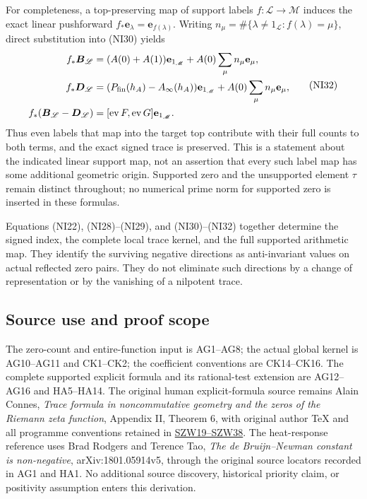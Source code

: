 \documentclass[
  10pt,
  a4paper,
]{article}
\begin{document}
For completeness, a top-preserving map of support labels
\(f:\mathscr L\to\mathscr M\) induces the exact linear pushforward
\(f_*\mathbf e_\lambda=\mathbf e_{f(\lambda)}\). Writing
\(n_\mu=\#\{\lambda\ne1_{\mathscr L}:f(\lambda)=\mu\}\), direct
substitution into (NI30) yields \[
\begin{aligned}
f_*\boldsymbol B_{\mathscr L}
&=(A(0)+A(1))\mathbf e_{1_{\mathscr M}}
+A(0)\sum_\mu n_\mu\mathbf e_\mu,\\
f_*\boldsymbol D_{\mathscr L}
&=(P_{\rm fin}(h_A)-A_\infty(h_A))\mathbf e_{1_{\mathscr M}}
+A(0)\sum_\mu n_\mu\mathbf e_\mu,\\
f_*(\boldsymbol B_{\mathscr L}-\boldsymbol D_{\mathscr L})
&=[\operatorname{ev}F,\operatorname{ev}G]\mathbf e_{1_{\mathscr M}}.
\end{aligned}
\tag{NI32}
\] Thus even labels that map into the target top contribute with their
full counts to both terms, and the exact signed trace is preserved. This
is a statement about the indicated linear support map, not an assertion
that every such label map has some additional geometric origin.
Supported zero and the unsupported element \(\tau\) remain distinct
throughout; no numerical prime norm for supported zero is inserted in
these formulas.

Equations (NI22), (NI28)--(NI29), and (NI30)--(NI32) together determine
the signed index, the complete local trace kernel, and the full
supported arithmetic map. They identify the surviving negative
directions as anti-invariant values on actual reflected zero pairs. They
do not eliminate such directions by a change of representation or by the
vanishing of a nilpotent trace.

\subsection{Source use and proof
scope}\label{source-use-and-proof-scope}

The zero-count and entire-function input is AG1--AG8; the actual global
kernel is AG10--AG11 and CK1--CK2; the coefficient conventions are
CK14--CK16. The complete supported explicit formula and its
rational-test extension are AG12--AG16 and HA5--HA14. The original human
explicit-formula source remains Alain Connes, \emph{Trace formula in
noncommutative geometry and the zeros of the Riemann zeta function},
Appendix II, Theorem 6, with original author TeX and all programme
conventions retained in
\href{https://github.com/KokunoYumeto/zeta-function-research-reader/blob/3c022a0adde0a6aa3d8fc8e43ef42795d88e44b0/workbenches/splitzero-tandem/branches/tau-zero-prime-positivity/SUPPORTED_ZERO_PRIME_WEIL_DERIVATION.md}{SZW19--SZW38}.
The heat-response reference uses Brad Rodgers and Terence Tao, \emph{The
de Bruijn--Newman constant is non-negative}, arXiv:1801.05914v5, through
the original source locators recorded in AG1 and HA1. No additional
source discovery, historical priority claim, or positivity assumption
enters this derivation.
\end{document}
